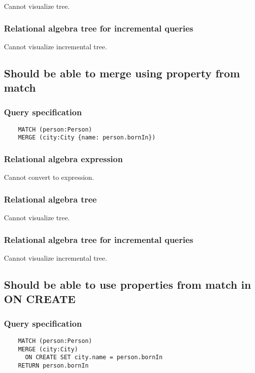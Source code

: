 	Cannot visualize tree.

	\subsubsection*{Relational algebra tree for incremental queries}

	Cannot visualize incremental tree.
	\subsection{Should be able to merge using property from match}

	\subsubsection*{Query specification}

	\begin{lstlisting}
	MATCH (person:Person)
	MERGE (city:City {name: person.bornIn})
	\end{lstlisting}


	\subsubsection*{Relational algebra expression}

	Cannot convert to expression.

	\subsubsection*{Relational algebra tree}

	Cannot visualize tree.

	\subsubsection*{Relational algebra tree for incremental queries}

	Cannot visualize incremental tree.
	\subsection{Should be able to use properties from match in ON CREATE}

	\subsubsection*{Query specification}

	\begin{lstlisting}
	MATCH (person:Person)
	MERGE (city:City)
	  ON CREATE SET city.name = person.bornIn
	RETURN person.bornIn
	\end{lstlisting}


